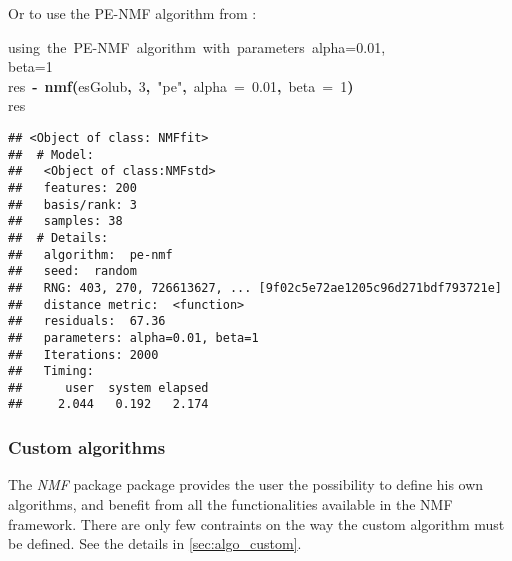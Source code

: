 \documentclass[a4paper]{article}\usepackage{graphicx, color}
\makeatletter
\newcommand{\hlnumber}[1]{\textcolor[rgb]{0,0,0}{#1}}%
\newcommand{\hlfunctioncall}[1]{\textcolor[rgb]{0.501960784313725,0,0.329411764705882}{\textbf{#1}}}%
\newcommand{\hlstring}[1]{\textcolor[rgb]{0.6,0.6,1}{#1}}%
\newcommand{\hlkeyword}[1]{\textcolor[rgb]{0,0,0}{\textbf{#1}}}%
\newcommand{\hlargument}[1]{\textcolor[rgb]{0.690196078431373,0.250980392156863,0.0196078431372549}{#1}}%
\newcommand{\hlcomment}[1]{\textcolor[rgb]{0.180392156862745,0.6,0.341176470588235}{#1}}%
\newcommand{\hlassignement}[1]{\textcolor[rgb]{0,0,0}{\textbf{#1}}}%
\newcommand{\hlsymbol}[1]{\textcolor[rgb]{0,0,0}{#1}}%
\newcommand{\hlstd}[1]{\textcolor[rgb]{0,0,0}{#1}}%
\newenvironment{kframe}{%
 \def\FrameCommand##1{\hskip\@totalleftmargin \hskip-\fboxsep
 \colorbox{shadecolor}{##1}\hskip-\fboxsep
     \hskip-\linewidth \hskip-\@totalleftmargin \hskip\columnwidth}%
 \MakeFramed {\advance\hsize-\width
   \@totalleftmargin\z@ \linewidth\hsize
   \@setminipage}}%
 {\par\unskip\endMakeFramed}
\newenvironment{knitrout}{}{} %
\let\code=\texttt
\newcommand{\pkgname}[1]{\textit{#1}\xspace}
\newcommand{\Rpkg}[1]{\pkgname{#1} package\xspace}
\newcommand{\nmfpack}{\Rpkg{NMF}}
\makeatother
\begin{document}
Or to use the PE-NMF algorithm from \cite{Zhang2008}:
\begin{knitrout}
\color{fgcolor}\begin{kframe}
\begin{flushleft}
\ttfamily\noindent
\hlcomment{\usebox{\hlnormalsizeboxhash}{\ }using{\ }the{\ }PE-NMF{\ }algorithm{\ }with{\ }parameters{\ }alpha=0.01,}\hspace*{\fill}\\
\hlstd{}\hlcomment{\usebox{\hlnormalsizeboxhash}{\ }beta=1}\hspace*{\fill}\\
\hlstd{}\hlsymbol{res}{\ }\hlassignement{\usebox{\hlnormalsizeboxlessthan}-}{\ }\hlfunctioncall{nmf}\hlkeyword{(}\hlsymbol{esGolub}\hlkeyword{,}{\ }\hlnumber{3}\hlkeyword{,}{\ }\hlstring{"{}pe"{}}\hlkeyword{,}{\ }\hlargument{alpha}{\ }\hlargument{=}{\ }\hlnumber{0.01}\hlkeyword{,}{\ }\hlargument{beta}{\ }\hlargument{=}{\ }\hlnumber{1}\hlkeyword{)}\hspace*{\fill}\\
\hlstd{}\hlsymbol{res}\mbox{}
\normalfont
\end{flushleft}
\begin{verbatim}
## <Object of class: NMFfit>
##  # Model:
##   <Object of class:NMFstd>
##   features: 200 
##   basis/rank: 3 
##   samples: 38 
##  # Details:
##   algorithm:  pe-nmf 
##   seed:  random 
##   RNG: 403, 270, 726613627, ... [9f02c5e72ae1205c96d271bdf793721e]
##   distance metric:  <function> 
##   residuals:  67.36 
##   parameters: alpha=0.01, beta=1 
##   Iterations: 2000 
##   Timing:
##      user  system elapsed 
##     2.044   0.192   2.174 
\end{verbatim}
\end{kframe}
\end{knitrout}


%
%
%


\subsubsection{Custom algorithms}
The \nmfpack package provides the user the possibility to define his own algorithms, and benefit from all the functionalities available in the NMF framework.
There are only few contraints on the way the custom algorithm must be defined.
See the details in \cref{sec:algo_custom}.
\end{document}
